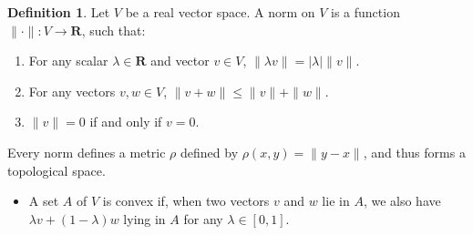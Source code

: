 \documentclass{report}
\theoremstyle{plain}
\theoremstyle{definition}
\newtheorem*{defi}{Definition}
\newenvironment{definition}
    {\begin{samepage}\begin{framed}\begin{defi}}
    {\end{defi}\end{framed}\end{samepage}}
\begin{document}
\begin{definition}
    Let $V$ be a real vector space. A norm on $V$ is a function $\| \cdot \|: V \to \mathbf{R}$, such that:
    \begin{enumerate}
        \item For any scalar $\lambda \in \mathbf{R}$ and vector $v \in V$, $\| \lambda v \| = | \lambda | \| v \|$.
        \item For any vectors $v,w \in V$, $\| v + w \| \leq \| v \| + \| w \|$.
        \item $\| v \| = 0$ if and only if $v = 0$.
    \end{enumerate}
    Every norm defines a metric $\rho$ defined by $\rho(x,y) = \| y - x \|$, and thus forms a topological space.
    \begin{itemize}
        \item A set $A$ of $V$ is convex if, when two vectors $v$ and $w$ lie in $A$, we also have $\lambda v + (1 - \lambda) w$ lying in $A$ for any $\lambda \in [0,1]$.
    \end{itemize}
\end{definition}
\end{document}
